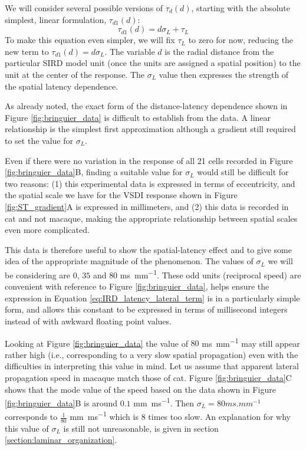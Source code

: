 \documentclass[phd,ianc,twoside]{infthesis}
\begin{document}
We will consider several possible versions of $\tau_d(d)$, starting with
the absolute simplest, linear formulation, $\tau_{d1}(d)$:
\begin{equation}
\label{eq:IRD_latency_lateral_term}
\tau_{d1}(d) =  d \sigma_L + \tau_L
\end{equation}
To make this equation even simpler, we will fix $\tau_L$ to zero for
now, reducing the new term to $\tau_{d1}(d) = d \sigma_L$. The variable
$d$ is the radial distance from the particular SIRD model unit (once the
units are assigned a spatial position) to the unit at the center of the
response. The $\sigma_L$ value then expresses the strength of the
spatial latency dependence.

As already noted, the exact form of the distance-latency dependence
shown in Figure \ref{fig:bringuier_data} is difficult to establish from
the data. A linear relationship is the simplest first approximation
although a gradient still required to set the value for $\sigma_L$.

Even if there were no variation in the response of all 21 cells recorded
in Figure \ref{fig:bringuier_data}B, finding a suitable value for
$\sigma_L$ would still be difficult for two reasons: (1) this
experimental data is expressed in terms of eccentricity, and the spatial
scale we have for the VSDI response shown in Figure
\ref{fig:ST_gradient}A is expressed in millimeters, and (2) this data is
recorded in cat and not macaque, making the appropriate relationship
between spatial scales even more complicated.

This data is therefore useful to show the spatial-latency effect and to
give some idea of the appropriate magnitude of the phenomenon.  The
values of $\sigma_L$ we will be considering are $0$, $35$ and $80$
\si{ms.mm^{-1}}. These odd units (reciprocal speed) are convenient with
reference to Figure \ref{fig:bringuier_data}, helps ensure the
expression in Equation \ref{eq:IRD_latency_lateral_term} is in a
particularly simple form, and allows this constant to be expressed in
terms of millisecond integers instead of with awkward floating point
values.

Looking at Figure \ref{fig:bringuier_data} the value of $80$
\si{ms.mm^{-1}} may still appear rather high (i.e., corresponding to a
very slow spatial propagation) even with the difficulties in
interpreting this value in mind. Let us assume that apparent lateral
propagation speed in macaque match those of cat. Figure
\ref{fig:bringuier_data}C shows that the mode value of the speed based
on the data shown in Figure \ref{fig:bringuier_data}B is around $0.1$
\si{mm.ms^{-1}}.  Then $\sigma_L=80 \si{ms.mm^{-1}}$ corresponds to
$\frac{1}{80}$ \si{mm.ms^{-1}} which is $8$ times too slow. An
explanation for why this value of $\sigma_L$ is still not unreasonable,
is given in section \ref{section:laminar_organization}.
\end{document}

